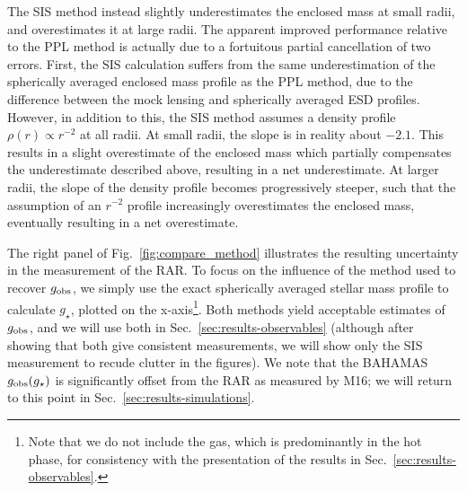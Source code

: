 \documentclass[usenatbib]{mnras}
\newcommand{\dex}{\, {\rm dex}}
\begin{document}
The SIS method instead slightly underestimates the enclosed mass at small radii, and overestimates it at large radii. The apparent improved performance relative to the PPL method is actually due to a fortuitous partial cancellation of two errors. First, the SIS calculation suffers from the same underestimation of the spherically averaged enclosed mass profile as the PPL method, due to the difference between the mock lensing and spherically averaged ESD profiles. However, in addition to this, the SIS method assumes a density profile $\rho(r)\propto r^{-2}$ at all radii. At small radii, the slope is in reality about $-2.1$. This results in a slight overestimate of the enclosed mass which partially compensates the underestimate described above, resulting in a net underestimate. At larger radii, the slope of the density profile becomes progressively steeper, such that the assumption of an $r^{-2}$ profile increasingly overestimates the enclosed mass, eventually resulting in a net overestimate.

The right panel of Fig.~\ref{fig:compare_method} illustrates the resulting uncertainty in the measurement of the RAR. To focus on the influence of the method used to recover $g_{\rm obs}$, we simply use the exact spherically averaged stellar mass profile to calculate $g_\star$, plotted on the x-axis\footnote{Note that we do not include the gas, which is predominantly in the hot phase, for consistency with the presentation of the results in Sec.~\ref{sec:results-observables}.}. Both methods yield acceptable estimates of $g_{\rm obs}$, and we will use both in Sec.~\ref{sec:results-observables} (although after showing that both give consistent measurements, we will show only the SIS measurement to recude clutter in the figures). We note that the BAHAMAS $g_{\rm obs}(g_\star)$ is significantly offset from the RAR as measured by M16; we will return to this point in Sec.~\ref{sec:results-simulations}.

\end{document}
